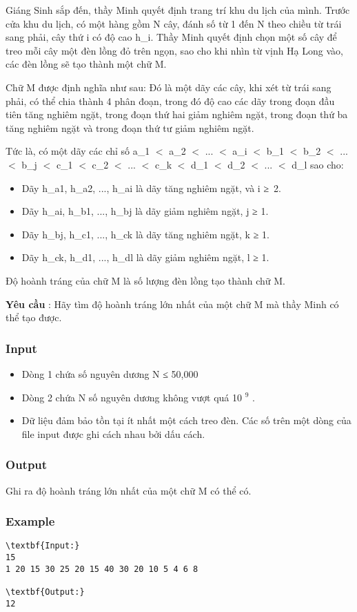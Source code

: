 



   Giáng Sinh sắp đến, thầy Minh quyết định trang trí khu du lịch của mình. Trước cửa khu du lịch, có một hàng gồm N cây, đánh số từ 1 đến N theo chiều từ trái sang phải, cây thứ i có độ cao h\_i. Thầy Minh quyết định chọn một số cây để treo mỗi cây một đèn lồng đỏ trên ngọn, sao cho khi nhìn từ vịnh Hạ Long vào, các đèn lồng sẽ tạo thành một chữ M.  

   Chữ M được định nghĩa như sau: Đó là một dãy các cây, khi xét từ trái sang phải, có thể chia thành 4 phân đoạn, trong đó độ cao các dãy trong đoạn đầu tiên tăng nghiêm ngặt, trong đoạn thứ hai giảm nghiêm ngặt, trong đoạn thứ ba tăng nghiêm ngặt và trong đoạn thứ tư giảm nghiêm ngặt.  

   Tức là, có một dãy các chỉ số a\_1 $<$ a\_2 $<$ ... $<$ a\_i $<$ b\_1 $<$ b\_2 $<$ ... $<$ b\_j $<$ c\_1 $<$ c\_2 $<$ ... $<$ c\_k $<$ d\_1 $<$ d\_2 $<$ ... $<$ d\_l sao cho:  
\begin{itemize}
	\item     Dãy h\_a1, h\_a2, ..., h\_ai là dãy tăng nghiêm ngặt, và i ≥ 2.   
	\item     Dãy h\_ai, h\_b1, ..., h\_bj là dãy giảm nghiêm ngặt, j         ≥        1.   
	\item     Dãy h\_bj, h\_c1, ..., h\_ck là dãy tăng nghiêm ngặt, k         ≥ 1.    
	\item      Dãy h\_ck, h\_d1, ..., h\_dl là dãy giảm nghiêm ngặt, l           ≥ 1.     
\end{itemize}

   Độ hoành tráng của chữ M là số lượng đèn lồng tạo thành chữ M.  

\textbf{    Yêu cầu   }   : Hãy tìm độ hoành tráng lớn nhất của một chữ M mà thầy Minh có thể tạo được.  

\subsubsection{   Input  }
\begin{itemize}
	\item     Dòng 1 chứa số nguyên dương N ≤ 50,000   
	\item     Dòng 2 chứa N số nguyên dương không vượt quá 10    $^     9    $    .   
	\item     Dữ liệu đảm bảo tồn tại ít nhất một cách treo đèn. Các số trên một dòng của file input được ghi cách nhau bởi dấu cách.   
\end{itemize}

\subsubsection{   Output  }

   Ghi ra độ hoành tráng lớn nhất của một chữ M có thể có.  

\subsubsection{   Example  }
\begin{verbatim}
\textbf{Input:}
15
1 20 15 30 25 20 15 40 30 20 10 5 4 6 8

\textbf{Output:}
12
\end{verbatim}
